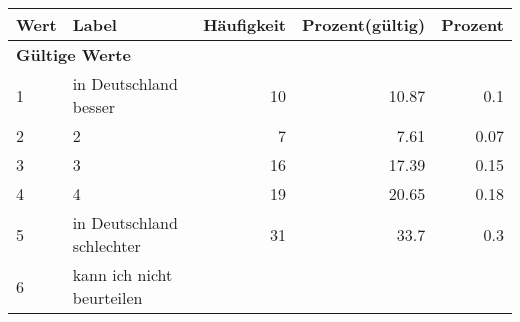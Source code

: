      \begin{longtable}{lXrrr}
     \toprule
     \textbf{Wert} & \textbf{Label} & \textbf{Häufigkeit} & \textbf{Prozent(gültig)} & \textbf{Prozent} \\
     \endhead
     \midrule
     \multicolumn{5}{l}{\textbf{Gültige Werte}}\\

     1 &
     \multicolumn{1}{X}{ in Deutschland besser   } &


       \num{10} &
       \num[round-mode=places,round-precision=2]{10,87} &
         \num[round-mode=places,round-precision=2]{0,1} \\

     2 &
     \multicolumn{1}{X}{ 2   } &


       \num{7} &
       \num[round-mode=places,round-precision=2]{7,61} &
         \num[round-mode=places,round-precision=2]{0,07} \\

     3 &
     \multicolumn{1}{X}{ 3   } &


       \num{16} &
       \num[round-mode=places,round-precision=2]{17,39} &
         \num[round-mode=places,round-precision=2]{0,15} \\

     4 &
     \multicolumn{1}{X}{ 4   } &


       \num{19} &
       \num[round-mode=places,round-precision=2]{20,65} &
         \num[round-mode=places,round-precision=2]{0,18} \\

     5 &
     \multicolumn{1}{X}{ in Deutschland schlechter   } &


       \num{31} &
       \num[round-mode=places,round-precision=2]{33,7} &
         \num[round-mode=places,round-precision=2]{0,3} \\

     6 &
     \multicolumn{1}{X}{ kann ich nicht beurteilen   } &



\end{longtable}
